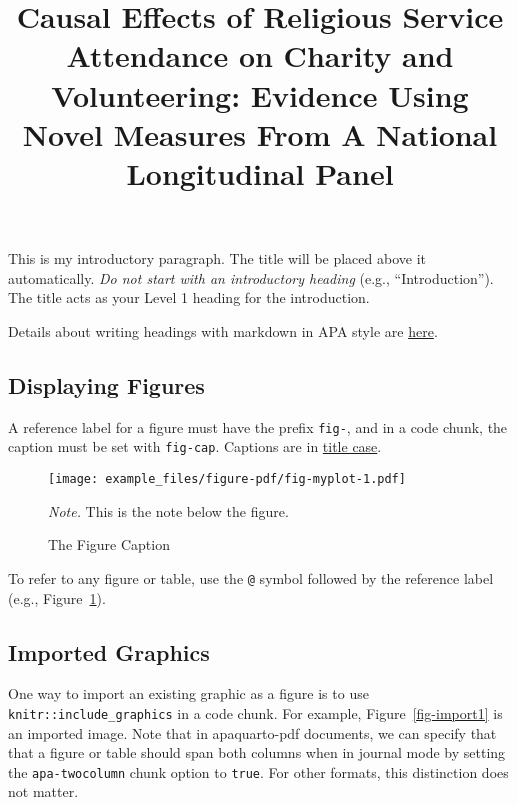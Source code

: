 \documentclass[
  man,
  longtable,
  nolmodern,
  notxfonts,
  notimes,
  colorlinks=true,linkcolor=blue,citecolor=blue,urlcolor=blue]{apa7}
\title{Causal Effects of Religious Service Attendance on Charity and
Volunteering: Evidence Using Novel Measures From A National Longitudinal
Panel}
\begin{document}
\maketitle


\setcounter{secnumdepth}{-\maxdimen} %

\setlength\LTleft{0pt}




This is my introductory paragraph. The title will be placed above it
automatically. \emph{Do not start with an introductory heading} (e.g.,
``Introduction''). The title acts as your Level 1 heading for the
introduction.

Details about writing headings with markdown in APA style are
\href{https://wjschne.github.io/apaquarto/writing.html\#headings-in-apa-style}{here}.

\subsection{Displaying Figures}\label{displaying-figures}

A reference label for a figure must have the prefix \texttt{fig-}, and
in a code chunk, the caption must be set with \texttt{fig-cap}. Captions
are in
\href{https://apastyle.apa.org/style-grammar-guidelines/capitalization/title-case}{title
case}.

\begin{figure}[!htbp]

{\caption{{The Figure Caption}{\label{fig-myplot}}}}

\texttt{[image: example\_files/figure-pdf/fig-myplot-1.pdf]}

{\noindent \emph{Note.} This is the note below the figure.}

\end{figure}

To refer to any figure or table, use the \texttt{@} symbol followed by
the reference label (e.g., Figure~\ref{fig-myplot}).

\subsection{Imported Graphics}\label{imported-graphics}

One way to import an existing graphic as a figure is to use
\texttt{knitr::include\_graphics} in a code chunk. For example,
Figure~\ref{fig-import1} is an imported image. Note that in
apaquarto-pdf documents, we can specify that that a figure or table
should span both columns when in journal mode by setting the
\texttt{apa-twocolumn} chunk option to \texttt{true}. For other formats,
this distinction does not matter.
\end{document}
